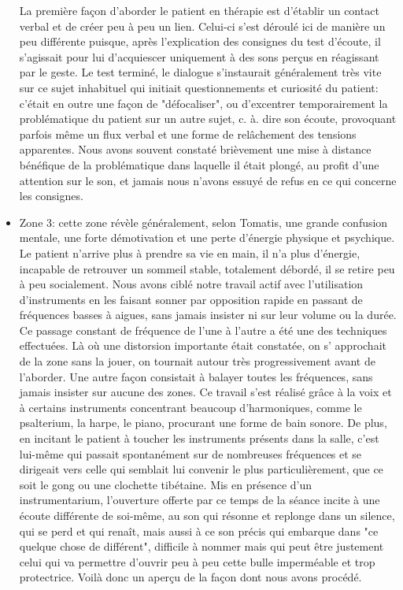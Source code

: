 \begin{itemize}
La première façon d'aborder le patient en thérapie est d'établir un contact verbal et de créer peu à peu 
un 
lien.
Celui-ci s'est déroulé ici de manière un peu différente puisque, après l'explication des consignes
du test d'écoute, il s'agissait pour lui d'acquiescer uniquement à des sons perçus en réagissant par le 
geste. Le 
test 
terminé, le dialogue s'instaurait 
généralement très vite sur ce sujet inhabituel 
qui initiait questionnements et curiosité du patient:  c'était en outre une façon de "défocaliser", ou 
d'excentrer  temporairement la problématique du patient sur un autre sujet, c. à. dire son 
écoute, provoquant parfois même un flux verbal et une forme de relâchement des tensions apparentes. 
Nous avons souvent constaté brièvement une mise à distance bénéfique de la problématique dans 
laquelle il était plongé, au profit d'une attention sur le son, et jamais nous n'avons  
essuyé de refus en ce qui concerne les consignes.	
	
	\item Zone 3: cette zone révèle généralement, selon Tomatis,  une grande  confusion 
	mentale, 
	une 
	forte  démotivation et une  perte d'énergie physique et 
	psychique. Le patient n'arrive plus à prendre sa vie en main, il n'a plus d'énergie, incapable de 
	retrouver un sommeil stable,
	totalement débordé, il se retire peu à peu socialement.%
	Nous avons ciblé notre travail actif avec l'utilisation d'instruments  en les faisant sonner par opposition 
	rapide en passant de  fréquences basses à aigues, 
	sans jamais insister ni sur leur volume ou la durée. Ce passage constant de fréquence de l'une à 
	l'autre a été une des 
	techniques effectuées.  Là où une distorsion importante était constatée, on s' approchait de la zone 
	sans la jouer, on tournait 
	autour très progressivement avant de l'aborder. Une autre façon consistait à balayer toutes les 
	fréquences, sans jamais 
	insister sur 
	aucune des zones. Ce travail s'est réalisé grâce à la voix et à certains instruments concentrant 
	beaucoup d'harmoniques,  
	comme le psalterium, la harpe, le piano, procurant une forme  de bain sonore. De plus, en incitant le 
	patient à 
	toucher 
	les 
	instruments présents dans la salle, c'est lui-même  qui passait spontanément sur de nombreuses 
	fréquences et se dirigeait vers celle qui semblait lui convenir le plus particulièrement, que ce soit le 
	gong ou une clochette tibétaine. Mis en présence d'un instrumentarium, l'ouverture offerte par ce 
	temps de la séance incite à une écoute différente de soi-même, au son qui résonne et replonge dans 
	un silence, qui se perd et qui renaît, mais aussi à ce son précis qui embarque dans "ce quelque chose 
	de différent", difficile à nommer mais qui peut être justement celui qui va permettre d'ouvrir peu à peu 
	cette bulle imperméable et trop protectrice.
	Voilà donc un aperçu de la  façon dont nous avons  procédé. 
\end{itemize}


